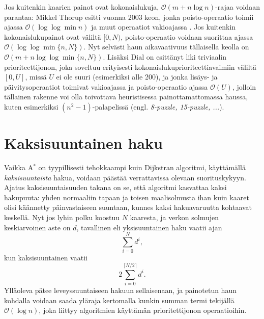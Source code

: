 \documentclass[finnish]{tktltiki2}
\theoremstyle{definition}
\theoremstyle{remark}
\begin{document}
Jos kuitenkin kaarien painot ovat kokonaislukuja, $\mathcal{O}(m + n \log n)$-rajaa voidaan parantaa:
Mikkel Thorup esitti vuonna 2003 keon, jonka poisto-operaatio toimii ajassa $\mathcal{O}(\log \log \min n)$ ja muut operaatiot vakioajassa \cite{Thorup03}. Jos kuitenkin kokonaislukupainot ovat väliltä $[0, N)$, poisto-operaatio voidaan suorittaa ajassa $\mathcal{O}(\log \log \min \{ n, N \})$. Nyt selvästi haun aikavaativuus tällaisella keolla on $\mathcal{O}(m + n \log \log \min \{n, N \})$. Lisäksi Dial on esittänyt liki triviaalin prioriteettijonon, joka soveltuu erityisesti kokonaislukuprioriteettiavaimiin väliltä $[0, U]$, missä $U$ ei ole suuri (esimerkiksi alle 200), ja jonka lisäys- ja päivitysoperaatiot toimivat vakioajassa ja poisto-operaatio ajassa $\mathcal{O}(U)$, jolloin tällainen rakenne voi olla toivottava heuristisessa painottamattomassa haussa, kuten esimerkiksi $(n^2 - 1)$-palapelissä (engl. \textit{8-puzzle, 15-puzzle, ...}).

\section{Kaksisuuntainen haku}
\label{sec:bidir}
Vaikka A$^{\ast}$ on tyypillisesti tehokkaampi kuin Dijkstran algoritmi, käyttämällä \textit{kaksisuuntaista} hakua, voidaan päästää verrattavissa olevaan suorituskykyyn. Ajatus kaksisuuntaisuuden takana on se, että algoritmi kasvattaa kaksi hakupuuta: yhden normaaliin tapaan ja toisen maalisolmusta ihan kuin kaaret olisi käännetty päinvastaiseen suuntaan, kunnes kaksi hakuavaruutta kohtaavat keskellä. Nyt jos lyhin polku koostuu $N$ kaaresta, ja verkon solmujen keskiarvoinen aste on $d$, tavallinen eli yksisuuntainen haku vaatii ajan
\[
\sum_{i = 0}^N d^i,
\]
kun kaksisuuntainen vaatii
\[
2 \sum_{i = 0}^{\lceil N / 2 \rceil} d^i.
\]
Ylläoleva pätee leveyssuuntaiseen hakuun sellaisenaan, ja painotetun haun kohdalla voidaan saada yläraja kertomalla kunkin summan termi tekijällä $\mathcal{O}(\log n)$, joka liittyy algoritmien käyttämän prioritettijonon operaatioihin. 
\end{document}
